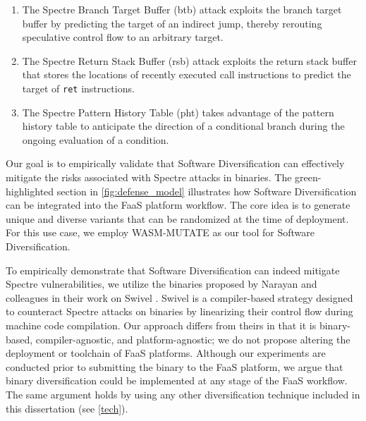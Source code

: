 \begin{enumerate}
    \item The Spectre Branch Target Buffer (btb) attack exploits the branch target buffer by predicting the target of an indirect jump, thereby rerouting speculative control flow to an arbitrary target.
    \item  The Spectre Return Stack Buffer (rsb) attack exploits the return stack buffer that stores the locations of recently executed call instructions to predict the target of \texttt{ret} instructions.
    \item The Spectre Pattern History Table (pht) takes advantage of the pattern history table to anticipate the direction of a conditional branch during the ongoing evaluation of a condition.
\end{enumerate}





Our goal is to empirically validate that Software Diversification can effectively mitigate the risks associated with Spectre attacks in \Wasm binaries. 
The green-highlighted section in \autoref{fig:defense_model} illustrates how Software Diversification can be integrated into the FaaS platform workflow. 
The core idea is to generate unique and diverse \Wasm variants that can be randomized at the time of deployment. 
For this use case, we employ WASM-MUTATE as our tool for Software Diversification.

To empirically demonstrate that Software Diversification can indeed mitigate Spectre vulnerabilities, we utilize the \Wasm binaries proposed by Narayan and colleagues in their work on Swivel \cite{Swivel}. 
Swivel is a compiler-based strategy designed to counteract Spectre attacks on \Wasm binaries by linearizing their control flow during machine code compilation. 
Our approach differs from theirs in that it is binary-based, compiler-agnostic, and platform-agnostic; we do not propose altering the deployment or toolchain of FaaS platforms. 
Although our experiments are conducted prior to submitting the \Wasm binary to the FaaS platform, we argue that \Wasm binary diversification could be implemented at any stage of the FaaS workflow.
The same argument holds by using any other diversification technique included in this dissertation (see \autoref{tech}).


